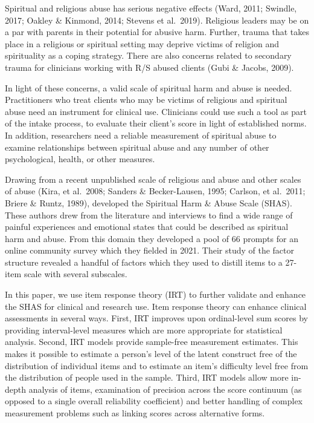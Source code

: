 \documentclass[
]{article}
\begin{document}
Spiritual and religious abuse has serious negative effects (Ward, 2011; Swindle, 2017; Oakley \& Kinmond, 2014; Stevens et al.~2019). Religious leaders may be on a par with parents in their potential for abusive harm. Further, trauma that takes place in a religious or spiritual setting may deprive victims of religion and spirituality as a coping strategy. There are also concerns related to secondary trauma for clinicians working with R/S abused clients (Gubi \& Jacobs, 2009).

In light of these concerns, a valid scale of spiritual harm and abuse is needed. Practitioners who treat clients who may be victims of religious and spiritual abuse need an instrument for clinical use. Clinicians could use such a tool as part of the intake process, to evaluate their client's score in light of established norms. In addition, researchers need a reliable measurement of spiritual abuse to examine relationships between spiritual abuse and any number of other psychological, health, or other measures.

Drawing from a recent unpublished scale of religious and abuse \citep{Keller2016} and other scales of abuse (Kira, et al.~2008; Sanders \& Becker-Lausen, 1995; Carlson, et al.~2011; Briere \& Runtz, 1989), \citet{KochEdstrom2022} developed the Spiritual Harm \& Abuse Scale (SHAS). These authors drew from the literature and interviews to find a wide range of painful experiences and emotional states that could be described as spiritual harm and abuse. From this domain they developed a pool of 66 prompts for an online community survey which they fielded in 2021. Their study of the factor structure revealed a handful of factors which they used to distill items to a 27-item scale with several subscales.

In this paper, we use item response theory (IRT) to further validate and enhance the SHAS for clinical and research use. Item response theory can enhance clinical assessments in several ways. First, IRT improves upon ordinal-level sum scores by providing interval-level measures which are more appropriate for statistical analysis. Second, IRT models provide sample-free measurement estimates. This makes it possible to estimate a person's level of the latent construct free of the distribution of individual items and to estimate an item's difficulty level free from the distribution of people used in the sample. Third, IRT models allow more in-depth analysis of items, examination of precision across the score continuum (as opposed to a single overall reliability coefficient) and better handling of complex measurement problems such as linking scores across alternative forms.
\end{document}
